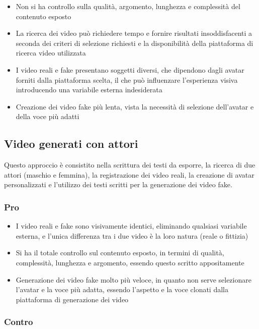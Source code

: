 \begin{itemize}
    \item Non si ha controllo sulla qualità, argomento, lunghezza e complessità del contenuto esposto
    \item La ricerca dei video può richiedere tempo e fornire risultati insoddisfacenti a seconda dei criteri di selezione richiesti e la disponibilità della piattaforma di ricerca video utilizzata
    \item I video reali e fake presentano soggetti diversi, che dipendono dagli avatar forniti dalla piattaforma scelta, il che può influenzare l'esperienza visiva introducendo una variabile esterna indesiderata
    \item Creazione dei video fake più lenta, vista la necessità di selezione dell'avatar e della voce più adatti
\end{itemize}

\subsection{Video generati con attori}

Questo approccio è consistito nella scrittura dei testi da esporre, la ricerca di due attori (maschio e femmina), la registrazione dei video reali, la creazione di avatar personalizzati e l'utilizzo dei testi scritti per la generazione dei video fake.

\subsubsection{Pro}

\begin{itemize}
    \item I video reali e fake sono visivamente identici, eliminando qualsiasi variabile esterna, e l'unica differenza tra i due video è la loro natura (reale o fittizia)
    \item Si ha il totale controllo sul contenuto esposto, in termini di qualità, complessità, lunghezza e argomento, essendo questo scritto appositamente
    \item Generazione dei video fake molto più veloce, in quanto non serve selezionare l'avatar e la voce più adatta, essendo l'aspetto e la voce clonati dalla piattaforma di generazione dei video
\end{itemize}

\subsubsection{Contro}

